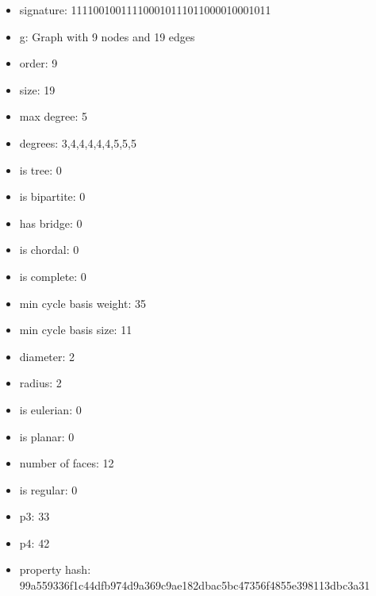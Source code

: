 \newpage
\begin{figure}
\end{figure}
\begin{itemize}
\item signature: 111100100111100010111011000010001011
\item g: Graph with 9 nodes and 19 edges
\item order: 9
\item size: 19
\item max degree: 5
\item degrees: 3,4,4,4,4,4,5,5,5
\item is tree: 0
\item is bipartite: 0
\item has bridge: 0
\item is chordal: 0
\item is complete: 0
\item min cycle basis weight: 35
\item min cycle basis size: 11
\item diameter: 2
\item radius: 2
\item is eulerian: 0
\item is planar: 0
\item number of faces: 12
\item is regular: 0
\item p3: 33
\item p4: 42
\item property hash: 99a559336f1c44dfb974d9a369c9ae182dbac5bc47356f4855e398113dbc3a31
\end{itemize}
